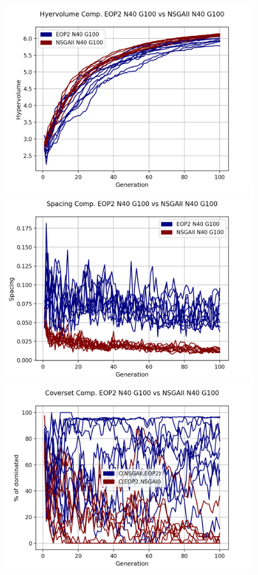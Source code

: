 \begin{figure}[H]
\centering
\includegraphics[scale=0.35]{../METRICS_PLOTS/Hypervol_COMP_EOP2N40G100_NSGAIIN40G100.png}
\includegraphics[scale=0.35]{../METRICS_PLOTS/Spacing_COMP_EOP2N40G100_NSGAIIN40G100.png}
\includegraphics[scale=0.35]{../METRICS_PLOTS/CoverSet_COMP_EOP2N40G100_NSGAIIN40G100.png}\\

\end{figure}
